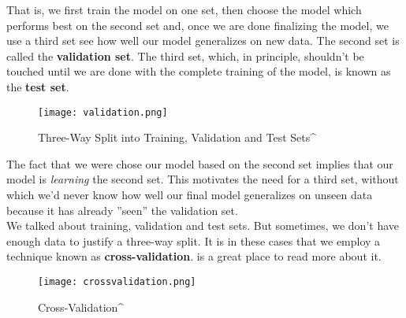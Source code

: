 \documentclass[12pt]{article}
\begin{document}
\noindent That is, we first train the model on one set, then choose the model which performs best on the second set and, once we are done finalizing the model, we use a third set see how well our model generalizes on new data. The second set is called the \textbf{validation set}. The third set, which, in principle, shouldn't be touched until we are done with the complete training of the model, is known as the \textbf{test set}. 
\\
\begin{figure}[h]

\centering
\texttt{[image: validation.png]}
\caption{Three-Way Split into Training, Validation and Test Sets^\cite{twowaysplit}}
\end{figure}


\noindent The fact that we were chose our model based on the second set implies that our model is \textit{learning} the second set. This motivates the need for a third set, without which we'd never know how well our final model generalizes on unseen data because it has already ''seen'' the validation set. 
\\

\noindent We talked about training, validation and test sets. But sometimes, we don't have enough data to justify a three-way split. It is in these cases that we employ a technique known as \textbf{cross-validation}.  \cite{crossvalidation} is a great place to read more about it.


\begin{figure}[h]

\centering
\texttt{[image: crossvalidation.png]}
\caption{Cross-Validation^\cite{crossvalidation}}
\end{figure}


\FloatBarrier



%

{\raggedright %
} %



\end{document}
